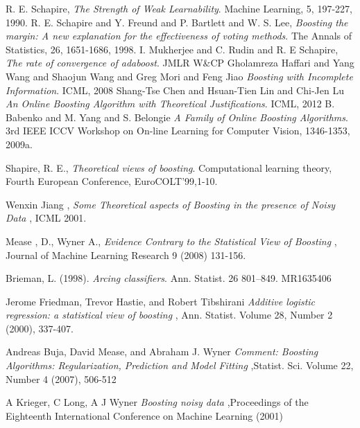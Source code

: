 \documentclass[letterpaper,11pt]{article}
\begin{document}
\begin{thebibliography}{9}

   R. E. Schapire,
  \emph{The  Strength  of Weak Learnability}.
  Machine Learning,
  5, 197-227,
  1990.
   R. E. Schapire and Y. Freund and P. Bartlett and W. S. Lee,
  \emph{Boosting the margin: A new explanation for the effectiveness of voting methods}.
  The Annals of Statistics,
  26, 1651-1686,
  1998.
   I. Mukherjee and C. Rudin and R. E Schapire,
  \emph{The rate of convergence of adaboost}.
  JMLR W\&CP
   Gholamreza Haffari and Yang Wang and Shaojun Wang and Greg Mori and Feng Jiao
  \emph{Boosting with Incomplete Information}.
  ICML, 
  2008
  Shang-Tse Chen and Hsuan-Tien Lin and Chi-Jen Lu
  \emph{An Online Boosting Algorithm with Theoretical Justifications}.
  ICML, 
  2012
  B. Babenko and M. Yang and S. Belongie
  \emph{A Family of Online Boosting Algorithms}.
  3rd IEEE ICCV Workshop on On-line Learning for Computer Vision, 
  1346-1353, 2009a.

  Shapire, R. E.,
 \emph{ Theoretical views of boosting}.
  Computational learning theory,
  Fourth European Conference, EuroCOLT'99,1-10.

  Wenxin Jiang ,
  \emph{ Some Theoretical aspects of Boosting in the presence of Noisy Data}
   , ICML 2001.

  Mease , D., Wyner A.,
  \emph{ Evidence Contrary to the Statistical View of Boosting}
   , Journal of Machine Learning Research 9 (2008) 131-156.

Brieman, L. (1998). 
\emph{Arcing classifiers}.
Ann. Statist. 26 801–849. MR1635406

Jerome Friedman, Trevor Hastie, and Robert Tibshirani
\emph{Additive logistic regression: a statistical view of boosting }
, Ann. Statist. Volume 28, Number 2 (2000), 337-407.

Andreas Buja, David Mease, and Abraham J. Wyner
\emph{Comment: Boosting Algorithms: Regularization, Prediction and Model Fitting}
,Statist. Sci. Volume 22, Number 4 (2007), 506-512

A Krieger, C Long, A J Wyner
\emph{Boosting noisy data}
,Proceedings of the Eighteenth International Conference on Machine Learning (2001)


\end{thebibliography}
\end{document}
